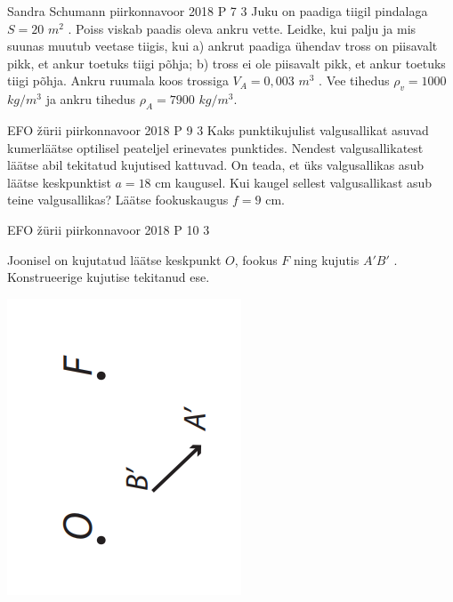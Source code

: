 \documentclass[11pt]{article}
\begin{document}
{%
{Sandra Schumann} %
{piirkonnavoor} %
{2018} %
{P 7} %
{3} %
{
\ifStatement
Juku on paadiga tiigil pindalaga $S = 20$ $m^2$ . Poiss viskab paadis oleva ankru vette. Leidke, kui palju ja mis suunas muutub veetase tiigis, kui 
\newline
a) ankrut paadiga ühendav tross on piisavalt pikk, et ankur toetuks tiigi põhja;
\newline
b) tross ei ole piisavalt pikk, et ankur toetuks tiigi põhja. Ankru ruumala koos trossiga $V_A = 0,003$ $m^3$ . Vee tihedus $\rho_v = 1000$ $kg/m^3$ ja ankru tihedus $\rho_A = 7900$ $kg/m^3$.
\fi
}

{EFO žürii} %
{piirkonnavoor} %
{2018} %
{P 9} %
{3} %
{
\ifStatement
Kaks punktikujulist valgusallikat asuvad kumerläätse optilisel peateljel erinevates punktides. Nendest valgusallikatest läätse abil tekitatud kujutised kattuvad. On teada, et üks valgusallikas asub läätse keskpunktist $a = 18$ cm kaugusel. Kui kaugel sellest valgusallikast asub teine valgusallikas? Läätse fookuskaugus $f = 9$ cm.
\fi
}


{EFO žürii} %
{piirkonnavoor} %
{2018} %
{P 10} %
{3} %
{
\ifStatement
Joonisel on kujutatud läätse keskpunkt $O$, fookus $F$ ning kujutis $A'B'$ . Konstrueerige kujutise tekitanud ese.
\begin{center}
	\includegraphics[width=0.5\linewidth]{2018-v2p-10-yl.PNG}
\end{center}
\fi
}


}
\end{document}
